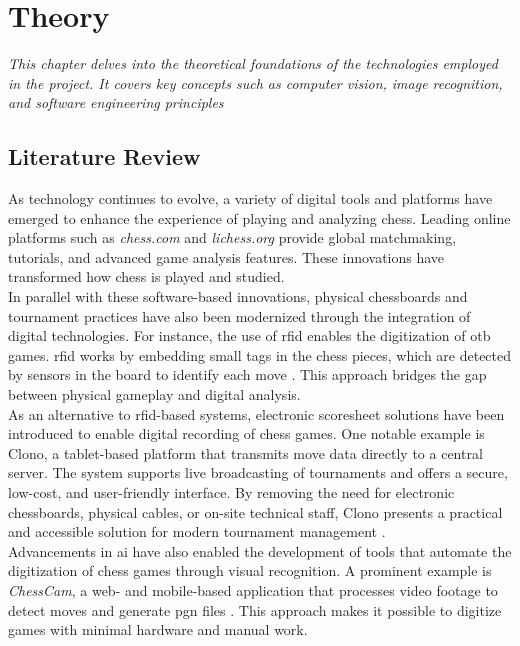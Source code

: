 \chapter{Theory}
\label{chp:theory}

\begin{center}
    \textit{This chapter delves into the theoretical foundations of the technologies employed in the project. It covers key concepts such as computer vision, image recognition, and software engineering principles}    
\end{center}

\section{Literature Review}
\label{sec:literature-review}

As technology continues to evolve, a variety of digital tools and platforms have emerged to enhance the experience of playing and analyzing chess. Leading online platforms such as \textit{chess.com} and \textit{lichess.org} provide global matchmaking, tutorials, and advanced game analysis features. These innovations have transformed how chess is played and studied. \\

In parallel with these software-based innovations, physical chessboards and tournament practices have also been modernized through the integration of digital technologies. For instance, the use of \gls{rfid} enables the digitization of \gls{otb} games. \gls{rfid} works by embedding small tags in the chess pieces, which are detected by sensors in the board to identify each move \cite{quora:shah}. This approach bridges the gap between physical gameplay and digital analysis. \\

As an alternative to \gls{rfid}-based systems, electronic scoresheet solutions have been introduced to enable digital recording of chess games. One notable example is Clono, a tablet-based platform that transmits move data directly to a central server. The system supports live broadcasting of tournaments and offers a secure, low-cost, and user-friendly interface. By removing the need for electronic chessboards, physical cables, or on-site technical staff, Clono presents a practical and accessible solution for modern tournament management \cite{clono}. \\

Advancements in \gls{ai} have also enabled the development of tools that automate the digitization of chess games through visual recognition. A prominent example is \textit{ChessCam}, a web- and mobile-based application that processes video footage to detect moves and generate \gls{pgn} files \cite{github:chesscam, lichess:chesscam}. This approach makes it possible to digitize games with minimal hardware and manual work.

